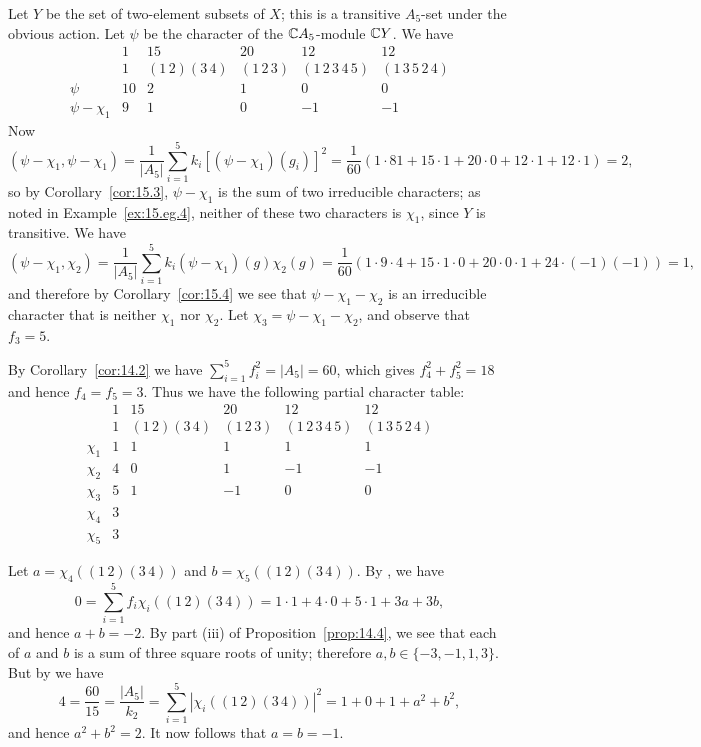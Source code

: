 \documentclass[../Odyssey_Project.tex]{subfiles}
\begin{document}
\begin{example}
Let $Y$ be the set of two-element subsets of $X$; this is a transitive $A_5$-set under the obvious action. Let $\psi$ be the character of the $\mathbb{C} A_5$-module $\mathbb{C} Y$. We have
\[
    \begin{array}{c|ccccc}
        & 1 & 15 & 20 & 12 & 12 \\
        & 1 & (1\,2)(3\,4) & (1\,2\,3) & (1\,2\,3\,4\,5) & (1\,3\,5\,2\,4) \\
        \hline
        \psi & 10 & 2 & 1 & 0 & 0 \\
        \psi - \chi_1 & 9 & 1 & 0 & -1 & -1
    \end{array}
\]
Now
\[
    (\psi - \chi_1, \psi - \chi_1) = \frac{1}{|A_5|}\sum_{i=1}^{5} k_i[(\psi - \chi_1)(g_i)]^2 = \frac{1}{60}(1 \cdot 81 + 15 \cdot 1 + 20 \cdot 0 + 12 \cdot 1 + 12 \cdot 1) = 2,
\]
so by Corollary~\ref{cor:15.3}, $\psi - \chi_1$ is the sum of two irreducible characters; as noted in Example~\ref{ex:15.eg.4}, neither of these two characters is $\chi_1$, since $Y$ is transitive. We have
\[
    (\psi - \chi_1, \chi_2) = \frac{1}{|A_5|}\sum_{i=1}^{5} k_i(\psi - \chi_1)(g)\chi_2(g) = \frac{1}{60}(1 \cdot 9 \cdot 4 + 15 \cdot 1 \cdot 0 + 20 \cdot 0 \cdot 1 + 24 \cdot (-1)(-1)) = 1,
\]
and therefore by Corollary~\ref{cor:15.4} we see that $\psi - \chi_1 - \chi_2$ is an irreducible character that is neither $\chi_1$ nor $\chi_2$. Let $\chi_3 = \psi - \chi_1 - \chi_2$, and observe that $f_3 = 5$.

By Corollary~\ref{cor:14.2} we have $\sum_{i=1}^{5} f_i^2 = |A_5| = 60$, which gives $f_4^2 + f_5^2 = 18$ and hence $f_4 = f_5 = 3$. Thus we have the following partial character table:
\[
    \begin{array}{c|ccccc}
        & 1 & 15 & 20 & 12 & 12 \\
        & 1 & (1\,2)(3\,4) & (1\,2\,3) & (1\,2\,3\,4\,5) & (1\,3\,5\,2\,4) \\
        \hline
        \chi_1 & 1 & 1 & 1 & 1 & 1 \\
        \chi_2 & 4 & 0 & 1 & -1 & -1 \\
        \chi_3 & 5 & 1 & -1 & 0 & 0 \\
        \chi_4 & 3 & & & & \\
        \chi_5 & 3 & & & &
    \end{array}
\]

Let $a = \chi_4((1\,2)(3\,4))$ and $b = \chi_5((1\,2)(3\,4))$. By , we have
\[
    0 = \sum_{i=1}^{5} f_i \chi_i((1\,2)(3\,4)) = 1 \cdot 1 + 4 \cdot 0 + 5 \cdot 1 + 3a + 3b,
\]
and hence $a + b = -2$. By part (iii) of Proposition~\ref{prop:14.4}, we see that each of $a$ and $b$ is a sum of three square roots of unity; therefore $a, b \in \{-3, -1, 1, 3\}$. But by  we have
\[
    4 = \frac{60}{15} = \frac{|A_5|}{k_2} = \sum_{i=1}^{5} |\chi_i((1\,2)(3\,4))|^2 = 1 + 0 + 1 + a^2 + b^2,
\]
and hence $a^2 + b^2 = 2$. It now follows that $a = b = -1$.


\end{example}
\end{document}
